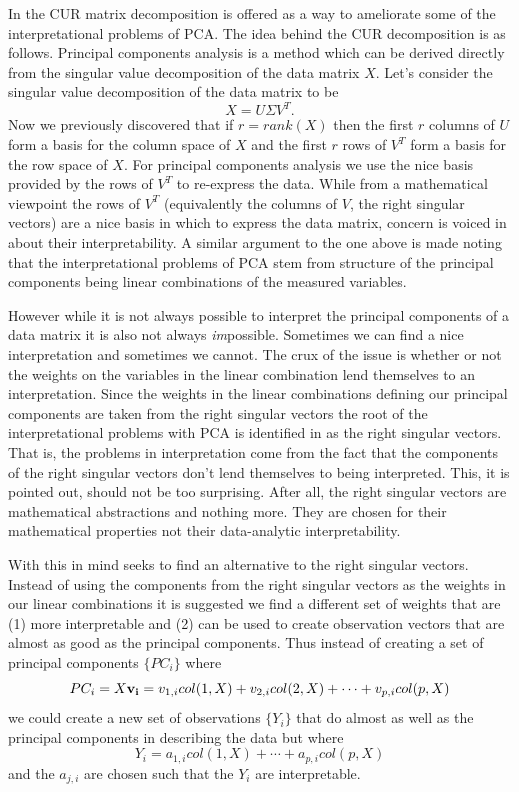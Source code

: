 \documentclass{book}
\begin{document}
In \cite{pnas} the CUR matrix decomposition is offered as a way to ameliorate some of the interpretational problems of PCA. The idea behind the CUR decomposition is as follows. Principal components analysis is a method which can be derived directly from the singular value decomposition of the data matrix $X$. Let's consider the singular value decomposition of the data matrix to be
$$
X=U\Sigma V^T.
$$
Now we previously discovered that if $r=rank(X)$ then the first $r$ columns of $U$ form a basis for the column space of $X$ and the first $r$ rows of $V^T$ form a basis for the row space of $X$. For principal components analysis we use the nice basis provided by the rows of $V^T$ to re-express the data. While from a mathematical viewpoint the rows of $V^T$ (equivalently the columns of $V$, the right singular vectors) are a nice basis in which to express the data matrix, concern is voiced in \cite{pnas} about their interpretability. A similar argument to the one above is made noting that the interpretational problems of PCA stem from structure of the principal components being linear combinations of the measured variables. 

However while it is not always possible to interpret the principal components of a data matrix it is also not always \emph{im}possible. Sometimes we can find a nice interpretation and sometimes we cannot. The crux of the issue is whether or not the weights on the variables in the linear combination lend themselves to an interpretation. Since the weights in the linear combinations defining our principal components are taken from the right singular vectors the root of the interpretational problems with PCA is identified in \cite{pnas} as the right singular vectors. That is, the problems in interpretation come from the fact that the components of the right singular vectors don't lend themselves to being interpreted. This, it is pointed out, should not be too surprising. After all, the right singular vectors are mathematical abstractions and nothing more. They are chosen for their mathematical properties not their data-analytic interpretability. 

With this in mind \cite{pnas} seeks to find an alternative to the right singular vectors. Instead of using the components from the right singular vectors as the weights in our linear combinations it is suggested we find a different set of weights that are (1) more interpretable and (2) can be used to create observation vectors that are almost as good as the principal components. Thus instead of creating a set of principal components $\{PC_i\}$ where
$$
PC_i=X{\bf v_i}=v_{1,i}col(1,X)+v_{2,i}col(2,X)+\cdots+v_{p,i}col(p,X)
$$
we could create a new set of observations $\{Y_i\}$ that do almost as well as the principal components in describing the data but where
$$
Y_i=a_{1,i}col(1,X)+\cdots+a_{p,i}col(p,X)
$$
and the $a_{j,i}$ are chosen such that the $Y_i$ are interpretable. 
\end{document}
